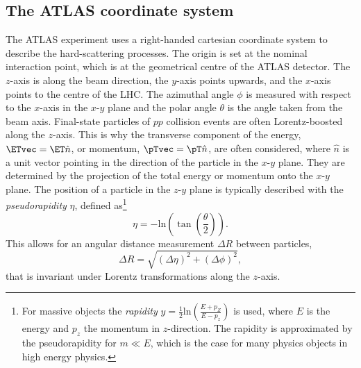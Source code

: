 \subsection{The ATLAS coordinate system}
The ATLAS experiment uses a right-handed cartesian coordinate system to describe the hard-scattering processes. The origin is set at the nominal interaction point, which is at the geometrical centre of the ATLAS detector. The $z$-axis is along the beam direction, the $y$-axis points upwards, and the $x$-axis points to the centre of the LHC. The azimuthal angle $\phi$ is measured with respect to the $x$-axis in the $x$-$y$ plane and the polar angle $\theta$ is the angle taken from the beam axis.
Final-state particles of $pp$ collision events are often Lorentz-boosted along the $z$-axis.
This is why the transverse component of the energy, $\ETvec = \ET \hat{n}$, or momentum, $\pTvec = \pT \hat{n}$, are often considered, where $\hat{n}$ is a unit vector pointing in the direction of the particle in the $x$-$y$ plane. They are determined by the projection of the total energy or momentum onto the $x$-$y$ plane.
The position of a particle in the $z$-$y$ plane is typically described with the \emph{pseudorapidity} $\eta$, defined as\footnote{For massive objects the \emph{rapidity} $y = \frac{1}{2} \text{ln} \left( \frac{E + p_Z }{E-p_z} \right)$ is used, where $E$ is the energy and $p_z$ the momentum in $z$-direction. The rapidity is approximated by the pseudorapidity for $m \ll E$, which is the case for many physics objects in high energy physics.}
\begin{equation}
    \eta = - \text{ln} \left( \tan \left( \frac{\theta}{2} \right) \right).
\end{equation}
This allows for an angular distance measurement $\Delta R$ between particles,
\begin{equation}
    \label{eq:delta-r}
    \Delta R = \sqrt{ \left( \Delta \eta \right) ^2 + \left( \Delta \phi \right) ^2 },
\end{equation}
that is invariant under Lorentz transformations along the $z$-axis.


